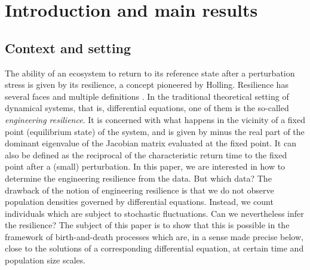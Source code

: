 \section{Introduction and main results}\label{sec:intro}

\subsection{Context and setting}

The ability of an ecosystem to return to its reference state after a perturbation stress is given by its resilience, a concept
pioneered by Holling. Resilience has several faces and multiple definitions \cite{resilience-book}. In the traditional theoretical
setting of dynamical systems, that is, differential equations, one of them is the so-called {\em engineering resilience}. It
is concerned with what happens in the vicinity of a fixed point (equilibrium state) of the system, and is given by minus the real
part of the dominant eigenvalue of the Jacobian matrix evaluated at the fixed point. It can also be defined as the reciprocal of
the characteristic return time to the fixed point after a (small) perturbation.
In this paper, we are interested in how to determine the engineering resilience from the data. But which data?
The drawback of the notion of engineering resilience is that we do not observe population densities governed by differential equations.
Instead, we count individuals which are subject to stochastic fluctuations. Can we nevertheless infer the resilience? The subject of this
paper is to show that this is possible in the framework of birth-and-death processes which are, in a sense made precise below,
close to the solutions of a corresponding differential equation, at certain time and population size scales.

